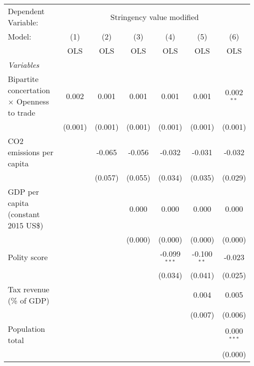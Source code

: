 
\begingroup
\centering
\begin{tabular}{lcccccc}
   \toprule
   Dependent Variable: & \multicolumn{6}{c}{Stringency value modified}\\
   Model:                                             & (1)     & (2)     & (3)     & (4)            & (5)           & (6)\\  
                                                      &  OLS    & OLS     & OLS     & OLS            & OLS           & OLS\\  
   \midrule
   \emph{Variables}\\
   Bipartite concertation $\times$ Openness to trade  & 0.002   & 0.001   & 0.001   & 0.001          & 0.001         & 0.002$^{**}$\\   
                                                      & (0.001) & (0.001) & (0.001) & (0.001)        & (0.001)       & (0.001)\\   
   CO2 emissions per capita                           &         & -0.065  & -0.056  & -0.032         & -0.031        & -0.032\\   
                                                      &         & (0.057) & (0.055) & (0.034)        & (0.035)       & (0.029)\\   
   GDP per capita (constant 2015 US\$)                &         &         & 0.000   & 0.000          & 0.000         & 0.000\\   
                                                      &         &         & (0.000) & (0.000)        & (0.000)       & (0.000)\\   
   Polity score                                       &         &         &         & -0.099$^{***}$ & -0.100$^{**}$ & -0.023\\   
                                                      &         &         &         & (0.034)        & (0.041)       & (0.025)\\   
   Tax revenue (\% of GDP)                            &         &         &         &                & 0.004         & 0.005\\   
                                                      &         &         &         &                & (0.007)       & (0.006)\\   
   Population total                                   &         &         &         &                &               & 0.000$^{***}$\\   
                                                      &         &         &         &                &               & (0.000)\\   

\end{tabular}
